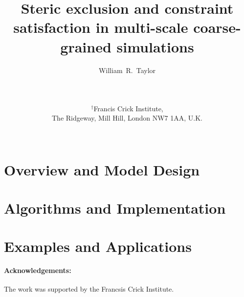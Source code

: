 \documentclass[12pt]{article}
\begin{document}
\title{\bf Steric exclusion and constraint satisfaction in multi-scale coarse-grained simulations
}

\author{
William~R.~Taylor\\ \\ \\ \\
$^\dagger$Francis Crick Institute,\\
The Ridgeway, Mill Hill, London NW7 1AA, U.K.\\ \\ 
}
\begin{singlespace}
\maketitle
\end{singlespace}
\clearpage
%
\section{Overview and Model Design}

\clearpage
\section{Algorithms and Implementation}

\clearpage

\clearpage
\section{Examples and Applications}


\clearpage
\begin{singlespace}


\paragraph{Acknowledgements:}
The work was supported by the Francsis Crick Institute.
\clearpage
%
\end{singlespace}
\end{document}
